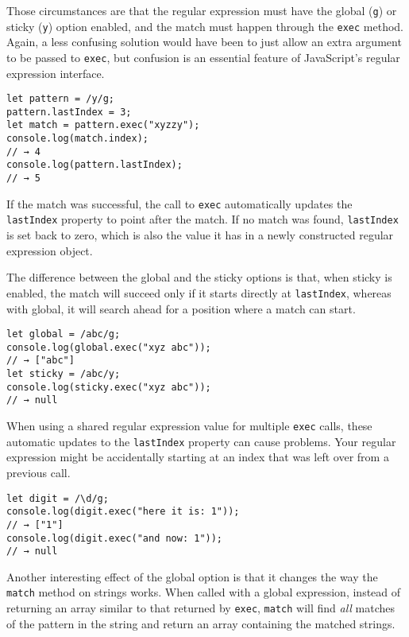Those circumstances are that the regular expression must have the global (\lstinline`g`) or sticky (\lstinline`y`) option enabled, and the match must happen through the \lstinline`exec` method. Again, a less confusing solution would have been to just allow an extra argument to be passed to \lstinline`exec`, but confusion is an essential feature of JavaScript's regular expression interface.

\begin{lstlisting}
let pattern = /y/g;
pattern.lastIndex = 3;
let match = pattern.exec("xyzzy");
console.log(match.index);
// → 4
console.log(pattern.lastIndex);
// → 5
\end{lstlisting}
\noindent{}

If the match was successful, the call to \lstinline`exec` automatically updates the \lstinline`lastIndex` property to point after the match. If no match was found, \lstinline`lastIndex` is set back to zero, which is also the value it has in a newly constructed regular expression object.

The difference between the global and the sticky options is that, when sticky is enabled, the match will succeed only if it starts directly at \lstinline`lastIndex`, whereas with global, it will search ahead for a position where a match can start.

\begin{lstlisting}
let global = /abc/g;
console.log(global.exec("xyz abc"));
// → ["abc"]
let sticky = /abc/y;
console.log(sticky.exec("xyz abc"));
// → null
\end{lstlisting}
\noindent{}

When using a shared regular expression value for multiple \lstinline`exec` calls, these automatic updates to the \lstinline`lastIndex` property can cause problems. Your regular expression might be accidentally starting at an index that was left over from a previous call.

\begin{lstlisting}
let digit = /\d/g;
console.log(digit.exec("here it is: 1"));
// → ["1"]
console.log(digit.exec("and now: 1"));
// → null
\end{lstlisting}
\noindent{}

Another interesting effect of the global option is that it changes the way the \lstinline`match` method on strings works. When called with a global expression, instead of returning an array similar to that returned by \lstinline`exec`, \lstinline`match` will find \emph{all} matches of the pattern in the string and return an array containing the matched strings.

